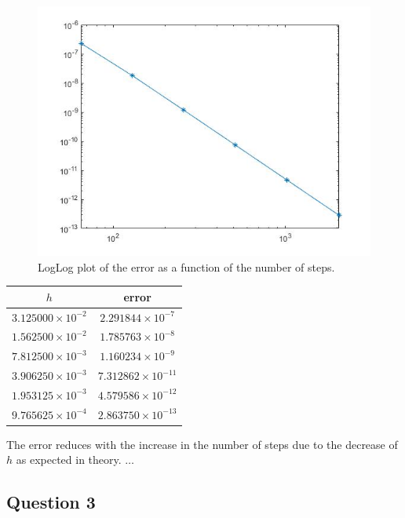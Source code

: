 \documentclass[a4paper, 11pt]{article}
\begin{document}
	\begin{figure}[H]
		\centering
		\includegraphics[width=\linewidth]{ex2.jpg}
		\caption{LogLog plot of the error as a function of the number of steps.}
		\label{fig:ex2}
	\end{figure}
	
	\begin{table}[H]
		\centering
		\begin{tabular}{c|c}
			\textbf{$h$}& \textbf{error}   \\ \hline
			$ 3.125000\times 10^{-2} $ & $ 2.291844\times 10^{-7} $ \\ \hline
			$ 1.562500\times 10^{-2} $ & $ 1.785763\times 10^{-8} $ \\ \hline
			$ 7.812500\times 10^{-3} $ & $ 1.160234\times 10^{-9} $ \\ \hline
			$ 3.906250\times 10^{-3} $ & $ 7.312862\times 10^{-11} $ \\ \hline
			$ 1.953125\times 10^{-3} $ & $ 4.579586\times 10^{-12} $ \\ \hline
			$ 9.765625\times 10^{-4} $ & $ 2.863750\times 10^{-13} $ \\ \hline
		\end{tabular}
	\end{table}
	
	The error reduces with the increase in the number of steps due to the decrease of $h$ as expected in theory. $\ldots$		
	
	\subsection*{Question 3}
	
\end{document}
